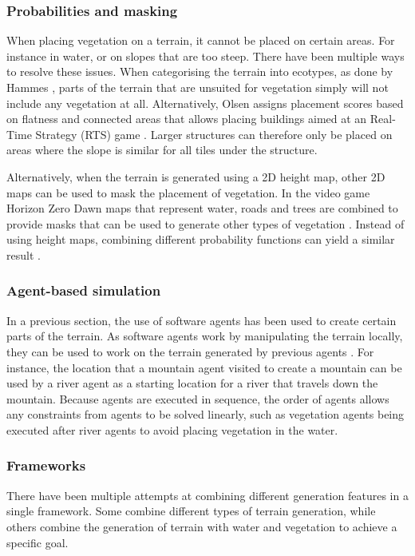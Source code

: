 \subsubsection{Probabilities and masking}
When placing vegetation on a terrain, it cannot be placed on certain areas. For instance in water, or on slopes that are too steep. There have been multiple ways to resolve these issues. When categorising the terrain into ecotypes, as done by Hammes \cite{hammes_modeling_2001}, parts of the terrain that are unsuited for vegetation simply will not include any vegetation at all. Alternatively, Olsen assigns placement scores based on flatness and connected areas that allows placing buildings aimed at an Real-Time Strategy (RTS) game \cite{olsen_realtime_2004}. Larger structures can therefore only be placed on areas where the slope is similar for all tiles under the structure.

Alternatively, when the terrain is generated using a 2D height map, other 2D maps can be used to mask the placement of vegetation. In the video game Horizon Zero Dawn maps that represent water, roads and trees are combined to provide masks that can be used to generate other types of vegetation \cite{van_muijden_gpu-based_2017}. Instead of using height maps, combining different probability functions can yield a similar result \cite{weier_generating_2013}.

\subsubsection{Agent-based simulation}
In a previous section, the use of software agents has been used to create certain parts of the terrain. As software agents work by manipulating the terrain locally, they can be used to work on the terrain generated by previous agents \cite{doran_controlled_2010}. For instance, the location that a mountain agent visited to create a mountain can be used by a river agent as a starting location for a river that travels down the mountain. Because agents are executed in sequence, the order of agents allows any constraints from agents to be solved linearly, such as vegetation agents being executed after river agents to avoid placing vegetation in the water.

\subsubsection{Frameworks}
There have been multiple attempts at combining different generation features in a single framework. Some combine different types of terrain generation, while others combine the generation of terrain with water and vegetation to achieve a specific goal.

